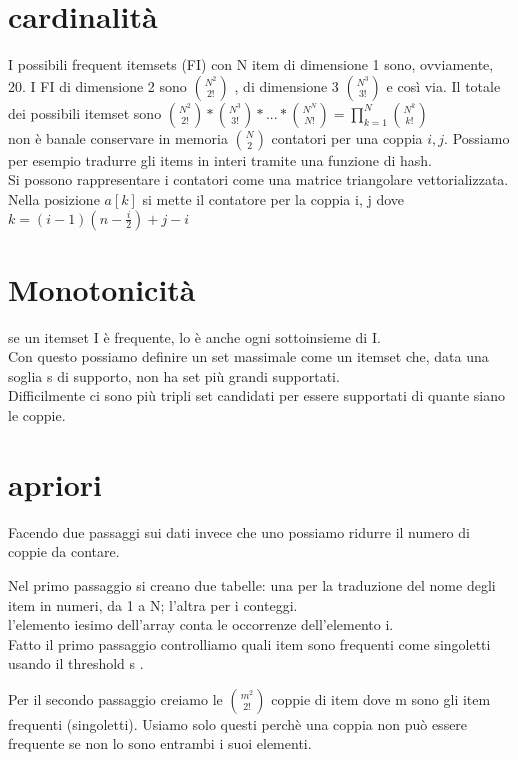 \documentclass[a4paper]{report}
\begin{document}
\section{cardinalità}
I possibili frequent itemsets (FI) con N item di dimensione 1 sono, ovviamente, 20.
I FI di dimensione 2 sono  $ N^2 \choose 2! $ , di dimensione 3  $ N^3 \choose 3! $ e così via.
Il totale dei possibili itemset sono $ {N^2 \choose 2!} * {N^3 \choose 3!} * ... * {N^N \choose N!} = \prod_{k = 1}^N {N^k  \choose k!}$\\
non è banale conservare in memoria $ {N \choose 2} $ contatori per una coppia ${i, j}$. Possiamo per esempio tradurre gli items in interi tramite una funzione di hash.\\
Si possono rappresentare i contatori come una matrice triangolare vettorializzata. Nella posizione $a[k]$ si mette il contatore per la coppia {i, j} dove $k = (i-1)(n- \frac{i}{2}) +j-i$

\section{Monotonicità}
se un itemset I è frequente, lo è anche ogni sottoinsieme di I.\\
Con questo possiamo definire un set massimale come un itemset che, data una soglia s di supporto, non ha set più grandi supportati.\\
Difficilmente ci sono più tripli set candidati per essere supportati di quante siano le coppie.

\section{apriori}
Facendo due passaggi sui dati invece che uno possiamo ridurre il numero di coppie da contare.

Nel primo passaggio si creano due tabelle: una per la traduzione del nome degli item in numeri, da 1 a N; l'altra per i conteggi.\\
l'elemento iesimo dell'array conta le occorrenze dell'elemento i.\\

Fatto il primo passaggio controlliamo quali item sono frequenti come singoletti usando il threshold s .

Per il secondo passaggio creiamo le ${m^2 \choose 2!}$ coppie di item dove m sono gli item frequenti (singoletti). Usiamo solo questi perchè una coppia non può essere frequente se non lo sono entrambi i suoi elementi.\\
\end{document}
